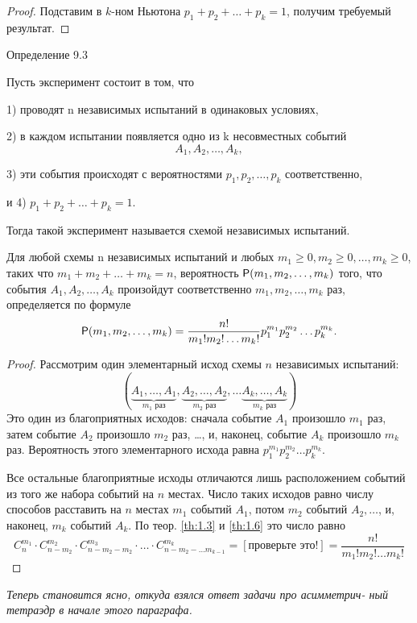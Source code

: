 \begin{proof}
	Подставим в $k$-ном Ньютона $p_1+p_2+\ldots+p_k = 1$,
получим требуемый результат.
\end{proof}

\begin{repdefinition}{Определение 9.3}


	Пусть эксперимент состоит в том, что

1) проводят n независимых испытаний в одинаковых условиях,

2) в каждом испытании появляется одно из k несовместных событий
{$$A_1, A_2,\ldots, A_k,$$}

3) эти события происходят с вероятностями $p_1, p_2,\ldots, p_k$ соответственно,

и 4) $p_1 + p_2 + \ldots+ p_k = 1$.

Тогда такой эксперимент называется схемой независимых испытаний.
\end{repdefinition}

\begin{theorem}
\label{th:9.5}

	Для любой схемы n независимых испытаний и любых \newline
$m_1 \geqslant 0, m_2 \geqslant 0,\ldots  , m_k \geqslant 0$, таких что $m_1 + m_2 +\ldots  + m_k = n$, вероятность $\P(m_1,m_2,\ldots  ,m_k)$ того, что события $A_1, A_2,\ldots  , A_k$ произойдут
соответственно $m_1,m_2,\ldots  ,m_k$ раз, определяется по формуле
	\begin{equation*}
		\P(m_1,m_2,\ldots,m_k)=\frac{n!}{m_1!m_2!\ldots m_k!}p_1^{m_1}p_2^{m_2}\ldots p_k^{m_k}.
	\end{equation*}
\end{theorem}

\begin{proof}
Рассмотрим один элементарный исход схемы $n$ независимых испытаний:
\begin{equation*}
	(\underbrace{A_1,\ldots , A_1}_{m_1 \text{ раз}}, 
	\underbrace{A_2, \ldots,A_2}_{m_2 \text{ раз}},
	\ldots
	\underbrace{A_k,\ldots , A_k}_{m_k \text{ раз}})
\end{equation*}
Это один из благоприятных исходов: сначала событие $A_1$ произошло $m_1$ раз,
затем событие $A_2$ произошло $m_2$ раз, \ldots, и, наконец, событие $A_k$ произошло
$m_k$ раз. Вероятность этого элементарного исхода равна 
$p^{m_1}_1p^{m_2}_2\ldots p^{m_k}_k$.

Все остальные благоприятные исходы отличаются лишь расположением
событий из того же набора событий на $n$ местах. Число таких исходов равно
числу способов расставить на $n$ местах $m_1$ событий $A_1$, потом $m_2$ событий
$A_2, \ldots$, и, наконец, $m_k$ событий $A_k$. По теор. \ref{th:1.3} и \ref{th:1.6} это число равно
\begin{equation*}
	C_n^{m_1}\cdot C_{n-m_2}^{m_2}\cdot C_{n-m_2-m_2}^{m_3}\cdot\ldots\cdot
	C_{n-m_2-\ldots m_{k-1}}^{m_k}=
	\left[\text{проверьте это!} \right]=\frac{n!}{m_1!m_2!\ldots m_k!}
\end{equation*}
\end{proof}
\textit{Теперь становится ясно, откуда взялся ответ задачи про асимметрич-
ный тетраэдр в начале этого параграфа.}